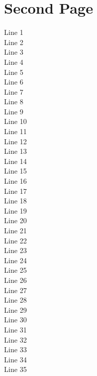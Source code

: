 \documentclass[10pt,english,a4paper,oneside]{amsart}
\begin{document}
\section{Second Page}
Line 1 \\
Line 2 \\
Line 3 \\
Line 4 \\
Line 5 \\
Line 6 \\
Line 7 \\
Line 8 \\
Line 9 \\
Line 10 \\
Line 11 \\
Line 12 \\
Line 13 \\
Line 14 \\
Line 15 \\
Line 16 \\
Line 17 \\
Line 18 \\
Line 19 \\
Line 20 \\
Line 21 \\
Line 22 \\
Line 23 \\
Line 24 \\
Line 25 \\
Line 26 \\
Line 27 \\
Line 28 \\
Line 29 \\
Line 30 \\
Line 31 \\
Line 32 \\
Line 33 \\
Line 34 \\
Line 35 \\
\end{document}
